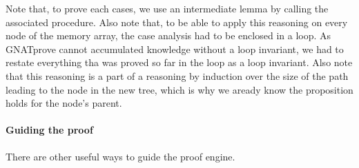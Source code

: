 \documentclass[11pt,a4paper]{article}
\begin{document}
Note that, to prove each cases, we use an intermediate lemma by calling the associated procedure.
Also note that, to be able to apply this reasoning on every node of the memory array, the case
analysis had to be enclosed in a loop. As GNATprove cannot accumulated knowledge without a loop
invariant, we had to restate everything tha was proved so far in the loop as a loop invariant.
Also note that this reasoning is a part of a reasoning by induction over the size of the path
leading to the node in the new tree, which is why we aready know the proposition holds for the
node's parent.

\paragraph{Guiding the proof}
There are other useful ways to guide the proof engine.
\end{document}
